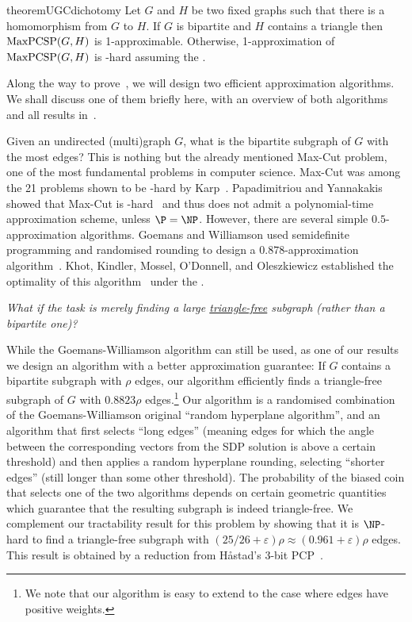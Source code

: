 \documentclass[a4paper,11pt, DIV=11]{scrartcl}
\renewcommand{\epsilon}{\varepsilon}
\DeclareMathOperator{\maxPCSP}{\textup{MaxPCSP}}
\theoremstyle{plain}
\theoremstyle{definition}
\begin{document}
\begin{restatable}{theorem}{UGCdichotomy}\label{thm:UGCdichotomy}
  Let $G$ and $H$ be two fixed graphs such that there is a homomorphism from $G$ to $H$. 
  If $G$ is bipartite and $H$ contains a triangle then $\maxPCSP(G,H)$ is 1-approximable. Otherwise, 1-approximation of $\maxPCSP(G,H)$ is \NP-hard assuming the \UGC.
\end{restatable}

Along the way to prove~, we will design two efficient
approximation algorithms. We shall discuss one of them briefly here, with an
overview of both algorithms and all results in~.

Given an undirected (multi)graph $G$, what is the bipartite subgraph of $G$ with
the most edges? This is nothing but the already mentioned Max-Cut problem, one of the most fundamental problems in computer science.
Max-Cut was among the 21 problems shown to be \NP-hard by Karp~\cite{Karp1972}.
Papadimitriou and Yannakakis showed that Max-Cut is
\APX-hard~\cite{PapadimitriouY91} and thus does not admit a polynomial-time
approximation scheme, unless $\P=\NP$. However, there are several simple
$0.5$-approximation algorithms. Goemans and Williamson used semidefinite
programming and randomised rounding to design a $0.878$-approximation
algorithm~\cite{GW95}. 
Khot, Kindler, Mossel, O'Donnell, and Oleszkiewicz established the optimality of
this algorithm~\cite{KKMO07,Mossel10:ann} under the \UGC.

\begin{center}\emph{What if the task is merely finding a large
  \underline{triangle-free} subgraph (rather than a bipartite one)?}
\end{center}

While the Goemans-Williamson algorithm can still be used, as one of our results
we design an algorithm with a better approximation guarantee: If $G$ contains a
bipartite subgraph with $\rho$ edges, our algorithm efficiently finds a
triangle-free subgraph of $G$ with $0.8823\rho$ edges.\footnote{We note that our
algorithm is easy to extend to the case where edges have positive weights.} Our
algorithm is a randomised combination of the Goemans-Williamson original
``random hyperplane algorithm'', and an algorithm that first selects ``long
edges'' (meaning edges for which the angle between the corresponding vectors
from the SDP solution is above a certain threshold) and then applies a random
hyperplane rounding, selecting ``shorter edges'' (still longer than some other
threshold). The probability of the biased coin that selects one of the two
algorithms depends on certain geometric quantities which guarantee that the
resulting subgraph is indeed triangle-free.
We complement our tractability result for this problem by showing that it is
$\NP$-hard to find a triangle-free subgraph with $(25 / 26 + \epsilon) \rho
\approx (0.961 + \epsilon) \rho$ edges. This result is obtained by a reduction
from H\aa{}stad's 3-bit PCP~\cite{Hastad01}.
\end{document}
